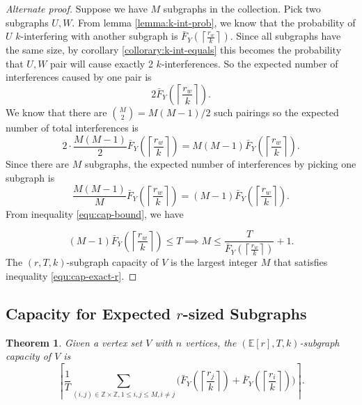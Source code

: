 \documentclass[10pt]{extarticle}
\newcommand{\Z}{\mathbb{Z}}
\newcommand{\E}{\mathbb{E}}
\newtheorem{theorem}{Theorem}
\theoremstyle{definition}
\begin{document}
\begin{proof}[Alternate proof]
    Suppose we have $M$ subgraphs in the collection. Pick two subgraphs $U,W$. From lemma \ref{lemma:k-int-prob}, we know that the probability of $U$ $k$-interfering with another subgraph is $\bar{F}_Y\left(\left\lceil \frac{r_w}{k} \right\rceil\right)$. Since all subgraphs have the same size, by corollary \ref{collorary:k-int-equals} this becomes the probability that $U,W$ pair will cause exactly 2 $k$-interferences. So the expected number of interferences caused by one pair is
    $$
    2\bar{F}_Y\left(\left\lceil \frac{r_w}{k} \right\rceil\right).
    $$
    We know that there are $\binom{M}{2} = M(M-1)/2$ such pairings so the expected number of total interferences is
    $$
    2 \cdot \frac{M(M-1)}{2} \bar{F}_Y\left(\left\lceil \frac{r_w}{k} \right\rceil\right)  =  M(M-1) \bar{F}_Y\left(\left\lceil \frac{r_w}{k} \right\rceil\right). 
    $$
    Since there are $M$ subgraphs, the expected number of interferences by picking one subgraph is
    $$
    \frac{M(M-1)}{M} \bar{F}_Y\left(\left\lceil \frac{r_w}{k} \right\rceil\right)  = (M-1) \bar{F}_Y\left(\left\lceil \frac{r_w}{k} \right\rceil\right).
    $$
    From inequality \ref{equ:cap-bound}, we have 

    \begin{equation*}
        (M-1) \bar{F}_Y\left(\left\lceil \frac{r_w}{k} \right\rceil\right) \le T \implies M \le \frac{T}{\bar{F}_Y\left(\left\lceil \frac{r_w}{k} \right\rceil\right)} + 1.
    \end{equation*}
The $(r,T,k)$-subgraph capacity of $V$ is the largest integer $M$ that satisfies inequality \ref{equ:cap-exact-r}.
\end{proof}

\subsection{Capacity for Expected $r$-sized Subgraphs}

\begin{theorem}
    Given a vertex set $V$ with $n$ vertices, the $(\E[r],T,k)$-subgraph capacity of $V$ is 
    \begin{equation*}
        \left\lceil \frac{1}{T}\sum_{(i,j) \in \Z\times\Z, 1 \le i,j \le M, i \ne j}  \Biggl( \bar{F}_Y\left(\left\lceil \frac{r_j}{k} \right\rceil\right) + \bar{F}_Y\left(\left\lceil \frac{r_i}{k} \right\rceil\right)\Biggr) \right\rceil.
    \end{equation*}
\end{theorem}
\end{document}
